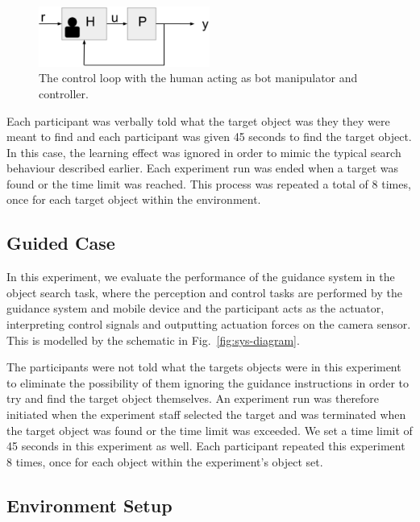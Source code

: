 \documentclass[runningheads]{llncs}
\begin{document}
\begin{figure}
  \centering
  \includegraphics[width=0.5\textwidth]{figures/control_loop_no_controller.png}
  \caption{The control loop with the human acting as bot manipulator and controller. }\label{fig:sys-diagram-no-controller}
\end{figure}

Each participant was verbally told what the target object was they they were meant to find and each participant was given 45 seconds to find the target object. 
In this case, the learning effect was ignored in order to mimic the typical search behaviour described earlier. 
Each experiment run was ended when a target was found or the time limit was reached. 
This process was repeated a total of 8 times, once for each target object within the environment. 

\subsection{Guided Case}

In this experiment, we evaluate the performance of the guidance system in the object search task, where the perception and control tasks are performed by the guidance system and mobile device and the participant acts as the actuator, interpreting control signals and outputting actuation forces on the camera sensor. 
This is modelled by the schematic in Fig.~\ref{fig:sys-diagram}. 

The participants were not told what the targets objects were in this experiment to eliminate the possibility of them ignoring the guidance instructions in order to try and find the target object themselves.
An experiment run was therefore initiated when the experiment staff selected the target and was terminated when the target object was found or the time limit was exceeded.
We set a time limit of 45 seconds in this experiment as well.
Each participant repeated this experiment 8 times, once for each object within the experiment's object set. 

\subsection{Environment Setup}
\end{document}
